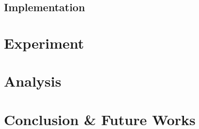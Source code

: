 \documentclass[conference]{configs/IEEEtran}
\begin{document}
\subsection{Implementation}


\section{Experiment}

\section{Analysis}

\section{Conclusion \& Future Works}

%




\vspace{12pt}
\end{document}
